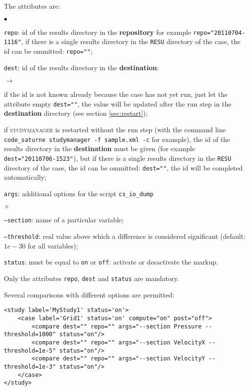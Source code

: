 \documentclass[a4paper,10pt,twoside]{csshortdoc}
\begin{document}
The attributes are:
\begin{list}{$\bullet$}{}

\item \texttt{repo}: id of the results directory in the \textbf{repository} for
example \texttt{repo="20110704-1116"}, if there is a single results directory
in the \texttt{RESU} directory of the case, the id can be ommitted:
\texttt{repo=""};

\item \texttt{dest}: id of the results directory in the \textbf{destination}:
\begin{list}{$\rightarrow$}{}
\item if the id is not known already because the case has not yet run, just let
the attribute empty \texttt{dest=""}, the value will be updated after the run
step in the \textbf{destination} directory (see section \ref{sec:restart});
\item if \textsc{studymanager} is restarted without the run step (with the command
line \texttt{code\_saturne studymanager -f sample.xml -c} for example), the id of
the results directory in the \textbf{destination} must be given (for example
\texttt{dest="20110706-1523"}), but if there is a single results directory in
the \texttt{RESU} directory of the case, the id can be ommitted:
\texttt{dest=""}, the id will be completed automatically;
\end{list}

\item \texttt{args}: additional options for the script \texttt{cs\_io\_dump}
\begin{list}{$\diamond$}{}
\item \texttt{--section}: name of a particular variable;
\item \texttt{--threshold}: real value above which a difference is considered
significant (default: $1e-30$ for all variables);
\end{list}
\item \texttt{status}: must be equal to \texttt{on} or \texttt{off}:
activate or desactivate the markup.
\end{list}

Only the attributes \texttt{repo}, \texttt{dest} and \texttt{status} are
mandatory.

Several comparisons with different options are permitted:
\small
\begin{verbatim}
<study label='MyStudy1' status='on'>
    <case label='Grid1' status='on' compute="on" post="off">
        <compare dest="" repo="" args="--section Pressure --threshold=1000" status="on"/>
        <compare dest="" repo="" args="--section VelocityX --threshold=1e-5" status="on"/>
        <compare dest="" repo="" args="--section VelocityY --threshold=1e-3" status="on"/>
    </case>
</study>
\end{verbatim}
\normalsize
\end{document}
